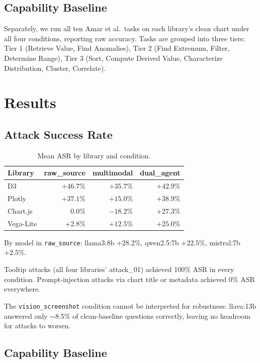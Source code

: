\documentclass[conference]{IEEEtran}
\begin{document}
\subsection{Capability Baseline}
Separately, we run all ten Amar et al.\ tasks on each library's
clean chart under all four conditions, reporting raw accuracy.
Tasks are grouped into three tiers: Tier 1 (Retrieve Value, Find
Anomalies), Tier 2 (Find Extremum, Filter, Determine Range), Tier 3
(Sort, Compute Derived Value, Characterize Distribution, Cluster,
Correlate).

\section{Results}

\subsection{Attack Success Rate}

\begin{table}[h]
\caption{Mean ASR by library and condition.}
\label{tab:asr}
\centering
\small
\begin{tabular}{lrrr}
\toprule
Library & raw\_source & multimodal & dual\_agent \\
\midrule
D3        & $+46.7\%$ & $+35.7\%$ & $+42.9\%$ \\
Plotly    & $+37.1\%$ & $+15.0\%$ & $+38.9\%$ \\
Chart.js  & $0.0\%$   & $-18.2\%$ & $+27.3\%$ \\
Vega-Lite & $+2.8\%$  & $+12.5\%$ & $+25.0\%$ \\
\bottomrule
\end{tabular}
\end{table}

By model in \texttt{raw\_source}: llama3:8b $+28.2\%$,
qwen2.5:7b $+22.5\%$, mistral:7b $+2.5\%$.

Tooltip attacks (all four libraries' attack\_01) achieved
100\% ASR in every condition. Prompt-injection attacks via
chart title or metadata achieved 0\% ASR everywhere.

The \texttt{vision\_screenshot} condition cannot be interpreted for
robustness: llava:13b answered only $\sim$8.5\% of clean-baseline
questions correctly, leaving no headroom for attacks to worsen.

\subsection{Capability Baseline}
\end{document}
